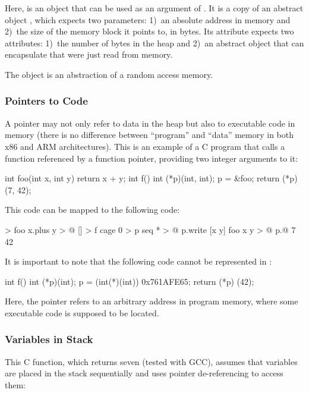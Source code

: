 \documentclass[sigplan,nonacm]{acmart}
\begin{document}
Here,  is an object that can be used as an argument of .
It is a copy of an abstract object , which expects two parameters:
  1)~an absolute address in memory
  and
  2)~the size of the memory block it points to, in bytes.
Its attribute  expects two attributes: 1)~the number of bytes in the heap and 2)~an abstract object that can encapsulate  that were just read from memory.

The object  is an abstraction of a random access memory.

\subsubsection{Pointers to Code}

A pointer may not only refer to data in the heap but also to executable code in memory (there is no difference between ``program'' and ``data'' memory in both x86 and ARM architectures).
This is an example of a C program that calls a function referenced by a function pointer, providing two integer arguments to it:

\begin{ffcode}
int foo(int x, int y) {
  return x + y;
}
int f() {
  int (*p)(int, int);
  p = &foo;
  return (*p) (7, 42);
}
\end{ffcode}

This code can be mapped to the following \eolang{} code:

\begin{ffcode}
[x y] > foo
  x.plus y > @
[] > f
  cage 0 > p
  seq * > @
    p.write
      [x y]
        foo x y > @
    p.@ 7 42
\end{ffcode}

It is important to note that the following code cannot be represented in \eolang{}:

\begin{ffcode}
int f() {
  int (*p)(int);
  p = (int(*)(int)) 0x761AFE65;
  return (*p) (42);
}
\end{ffcode}

Here, the pointer refers to an arbitrary address in program memory, where some executable code is supposed to be located.

\subsubsection{Variables in Stack}

This C function, which returns seven (tested with GCC), assumes that variables are placed in the stack sequentially and uses pointer de-referencing to access them:
\end{document}
